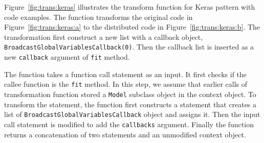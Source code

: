 \begin{inred}
Figure~\ref{fig:trans:keras} illustrates the transform function for Keras
pattern with code examples.
The function transforms the original code in Figure~\ref{fig:trans:keras:a}
to the distributed code in Figure~\ref{fig:trans:keras:b}.
The transformation first construct a new list with a
callback object, {\tt BroadcastGlobalVariablesCallback(0)}.
Then the callback list is inserted as a new {\tt callback} argument
of {\tt fit} method.

The function takes a function call statement as an input.
It first checks if the callee function is the {\tt fit} method.
In this step, we assume that earlier calls of transformation function
stored a {\tt Model} subclass object in the context object.
To transform the statement,
the function first constructs a statement that creates a list of
{\tt BroadcastGlobalVariablesCallback} object and assigns it.
Then the input call statement is modified to
add the {\tt callbacks} argument.
Finally the function returns a concatenation of two statements
and an unmodified context object.

\end{inred}

